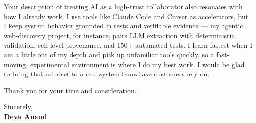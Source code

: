 \documentclass[letterpaper,11pt]{article}
\begin{document}
Your description of treating AI as a high-trust collaborator also resonates with how I already work. I use tools like Claude Code and Cursor as accelerators, but I keep system behavior grounded in tests and verifiable evidence --- my agentic web-discovery project, for instance, pairs LLM extraction with deterministic validation, cell-level provenance, and 150+ automated tests. I learn fastest when I am a little out of my depth and pick up unfamiliar tools quickly, so a fast-moving, experimental environment is where I do my best work. I would be glad to bring that mindset to a real system Snowflake customers rely on.

Thank you for your time and consideration.

\vspace{6pt}
Sincerely, \\
\textbf{Deva Anand}
\end{document}
